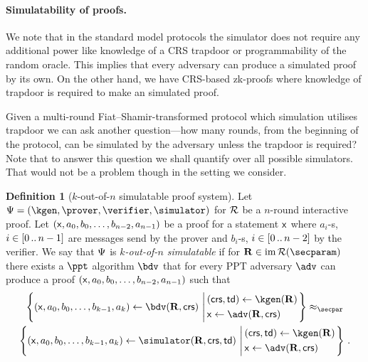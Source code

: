 \documentclass[runningheads,11pt]{llncs}
\theoremstyle{definition}
\newtheorem{definition}[theorem]{Definition}
\begin{document}
\paragraph{Simulatability of proofs.}
We note that in the standard model protocols the simulator does not require any additional power like knowledge of a CRS trapdoor or programmability of the random oracle. This implies that every adversary can produce a simulated proof by its own.
On the other hand, we have CRS-based zk-proofs where knowledge of trapdoor is required to make an simulated proof.

Given a multi-round Fiat--Shamir-transformed protocol which simulation utilises trapdoor we can ask another question---how many rounds, from the beginning of the protocol, can be simulated by the adversary unless the trapdoor is required? Note that to answer this question we shall quantify over all possible simulators. That would not be a problem though in the setting we consider.

\begin{definition}[$k$-out-of-$n$ simulatable proof system]
	Let $\proofsystem = (\kgen, \prover, \verifier, \simulator)$ for $\mathcal{R}$ be a $n$-round interactive proof. Let $(\mathsf{x}, a_0, b_0, \ldots, b_{n - 2}, a_{n - 1})$ be a proof for a statement $\mathsf{x}$ where $a_i$-s, $i \in [0 \, .. \, n - 1]$ are messages send by the prover and $b_i$-s, $i \in [0 \, .. \, n - 2]$ by the verifier.
	We say that $\mathrm{\Psi}$ is \emph{$k$-out-of-$n$ simulatable} if for  $\REL \in \image{\RELGEN(\secparam)}$ there exists a $\ppt$ algorithm $\bdv$ that for every PPT adversary $\adv$ can produce a proof $(\mathsf{x}, a_0, b_0, \ldots, b_{n - 2}, a_{n - 1})$ such that
	\begin{multline*}
		\left\{(\inp, a_0, b_0, \ldots, b_{k - 1}, a_{k}) \gets \bdv(\REL ,\crs) \,\left\vert\,
		\begin{aligned}
			 & (\crs, \td) \gets \kgen(\REL) \\
			 & \inp \gets \adv(\REL, \crs)
		\end{aligned}
		\right.
		\right\} \approx_\secpar \\
		\left\{(\inp, a_0, b_0, \ldots, b_{k - 1}, a_{k}) \gets \simulator(\REL, \crs, \td) \,\left\vert\,
		\begin{aligned}
			 & (\crs, \td) \gets \kgen(\REL) \\
			 & \inp \gets \adv(\REL, \crs)
		\end{aligned}
		\right.
		\right\}\,.
	\end{multline*}
\end{definition}
\end{document}
